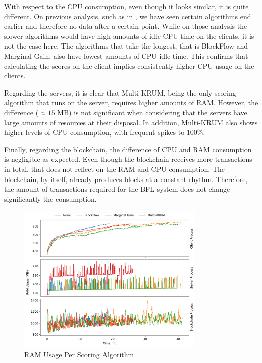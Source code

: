 With respect to the CPU consumption, even though it looks similar, it is quite different. On previous analysis, such as in , we have seen certain algorithms end earlier and therefore no data after a certain point. While on those analysis the slower algorithms would have high amounts of idle CPU time on the clients, it is not the case here. The algorithms that take the longest, that is BlockFlow and Marginal Gain, also have lowest amounts of CPU idle time. This confirms that calculating the scores on the client implies consistently higher CPU usage on the clients.

Regarding the servers, it is clear that Multi-KRUM, being the only scoring algorithm that runs on the server, requires higher amounts of RAM. However, the difference ($\approx 15$ MB) is not significant when considering that the servers have large amounts of resources at their disposal. In addition, Multi-KRUM also shows higher levels of CPU consumption, with frequent spikes to $100\%$.

Finally, regarding the blockchain, the difference of CPU and RAM consumption is negligible as expected. Even though the blockchain receives more transactions in total, that does not reflect on the RAM and CPU consumption. The blockchain, by itself, already produces blocks at a constant rhythm. Therefore, the amount of transactions required for the BFL system does not change significantly the consumption.

\begin{figure}[!hpt]
    \centering
    \centering
    \includegraphics[width=0.8\textwidth]{graphics/scoring/ram.pdf}
    \caption{RAM Usage Per Scoring Algorithm}
    \label{fig:ram_scoring}
\end{figure}

